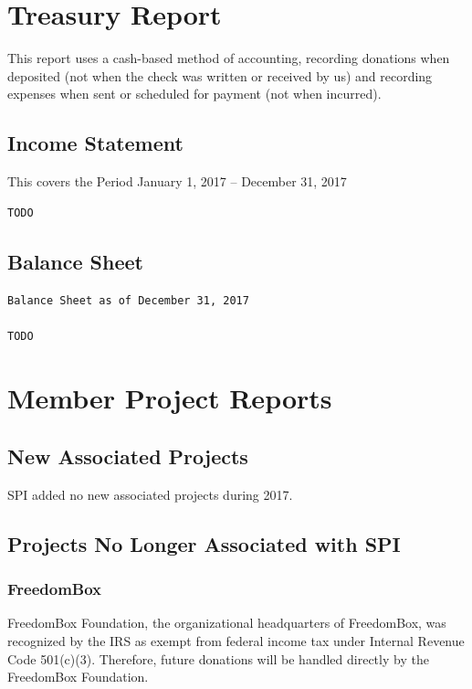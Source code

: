 \documentclass[a4paper]{report}
\begin{document}
\chapter{Treasury Report}

This report uses a cash-based method of accounting, recording donations when
deposited (not when the check was written or received by us) and recording
expenses when sent or scheduled for payment (not when incurred).

\section{Income Statement}

This covers the Period January 1, 2017 -- December 31, 2017

\begin{verbatim}
TODO
\end{verbatim}

\section{Balance Sheet}

\begin{verbatim}
Balance Sheet as of December 31, 2017

TODO
\end{verbatim}

\chapter{Member Project Reports}

\section{New Associated Projects}

SPI added no new associated projects during 2017.

\section{Projects No Longer Associated with SPI}

\subsection{FreedomBox}

FreedomBox Foundation, the organizational headquarters of FreedomBox,
was recognized by the IRS as exempt from federal income tax under
Internal Revenue Code 501(c)(3).  Therefore, future donations will
be handled directly by the FreedomBox Foundation.
\end{document}
